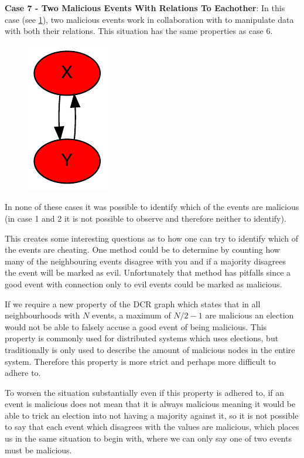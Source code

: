 	\newpar \textbf{Case 7 - Two Malicious Events With Relations To Eachother}: In this case (see \ref{fig:consensus:two-malicious-with-twoway-malicious-relation}), two malicious events work in collaboration with to manipulate data with both their relations. This situation has the same properties as case 6.
	
	\begin{figure}[H]
		\centering
		\includegraphics[]{5validation/images/7.pdf}
		\caption{}
		\label{fig:consensus:two-malicious-with-twoway-malicious-relation}
	\end{figure}
	
	\newpar In none of these cases it was possible to identify which of the events are malicious (in case 1 and 2 it is not possible to observe and therefore neither to identify). 
	
	This creates some interesting questions as to how one can try to identify which of the events are cheating. 
	One method could be to determine by counting how many of the neighbouring events disagree with you and if a majority disagrees the event will be marked as evil. Unfortunately that method has pitfalls since a good event with connection only to evil events could be marked as malicious. 
	
	If we require a new property of the DCR graph which states that in all neighbourhoods with $N$ events, a maximum of $N/2-1$ are malicious an election would not be able to falsely accuse a good event of being malicious. This property is commonly used for distributed systems which uses elections, but traditionally is only used to describe the amount of malicious nodes in the entire system. Therefore this property is more strict and perhaps more difficult to adhere to. 
	
	To worsen the situation substantially even if this property is adhered to, if an event is malicious does not mean that it is always malicious meaning it would be able to trick an election into not having a majority against it, so it is not possible to say that each event which disagrees with the values are malicious, which places us in the same situation to begin with, where we can only say one of two events must be malicious.
	
